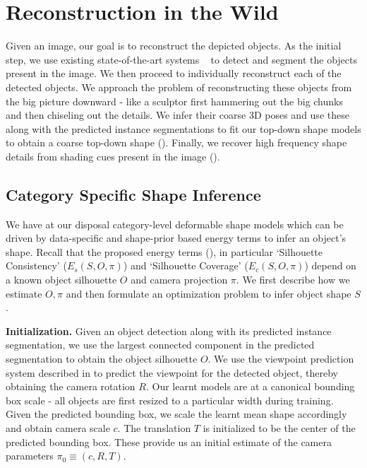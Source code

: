 \section{Reconstruction in the Wild}
Given an image, our goal is to reconstruct the depicted objects. As the initial step, we use existing state-of-the-art systems ~\cite{BharathECCV2014} to detect and segment the objects present in the image. We then proceed to individually reconstruct each of the detected objects. We approach the problem of reconstructing these objects from the big picture downward - like a sculptor first hammering out the big chunks and then chiseling out the details. We infer their coarse 3D poses and use these along with the predicted instance segmentations to fit our top-down shape models to obtain a coarse top-down shape (). Finally, we recover high frequency shape details from shading cues present in the image ().

\subsection{Category Specific Shape Inference}

We have at our disposal category-level deformable shape models which can be driven by data-specific and shape-prior based energy terms to infer an object's shape.  Recall that the proposed energy terms (), in particular `Silhouette Consistency' ($E_{s}(S,O,\pi)$) and  `Silhouette Coverage' ($E_{c}(S,O,\pi)$) depend on a known object silhouette $O$ and camera projection $\pi$. We first describe how we estimate $O,\pi$ and then formulate an optimization  problem to infer object shape $S$.

\vspace{3mm}
\noindent \textbf{Initialization.} Given an object detection along with its predicted instance segmentation, we use the largest connected component in the predicted segmentation to obtain the object silhouette $O$. We use the viewpoint prediction system described in  to predict the viewpoint for the detected object, thereby obtaining the camera rotation $R$. Our learnt models are at a canonical bounding box scale - all objects are first resized to a particular width during training. Given the predicted bounding box, we scale the learnt mean shape accordingly and obtain camera scale $c$. The translation $T$ is initialized to be the center of the predicted bounding box. These provide us an initial estimate of the camera parameters $\pi_0 \equiv (c,R,T)$.


